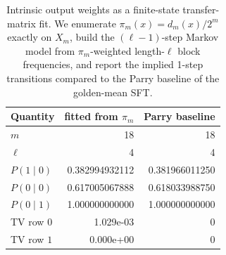 \begin{table}[H]
\centering
\scriptsize
\setlength{\tabcolsep}{6pt}
\caption{Intrinsic output weights as a finite-state transfer-matrix fit. We enumerate $\pi_m(x)=d_m(x)/2^m$ exactly on $X_m$, build the $(\ell{-}1)$-step Markov model from $\pi_m$-weighted length-$\ell$ block frequencies, and report the implied 1-step transitions compared to the Parry baseline of the golden-mean SFT.}
\label{tab:fold_output_gibbs_markov_fit}
\begin{tabular}{l r r}
\toprule
Quantity & fitted from $\pi_m$ & Parry baseline\\
\midrule
$m$ & 18 & 18\\
$\ell$ & 4 & 4\\
$P(1\mid 0)$ & 0.382994932112 & 0.381966011250\\
$P(0\mid 0)$ & 0.617005067888 & 0.618033988750\\
$P(0\mid 1)$ & 1.000000000000 & 1.000000000000\\
TV row $0$ & 1.029e-03 & 0\\
TV row $1$ & 0.000e+00 & 0\\
\bottomrule
\end{tabular}
\end{table}
